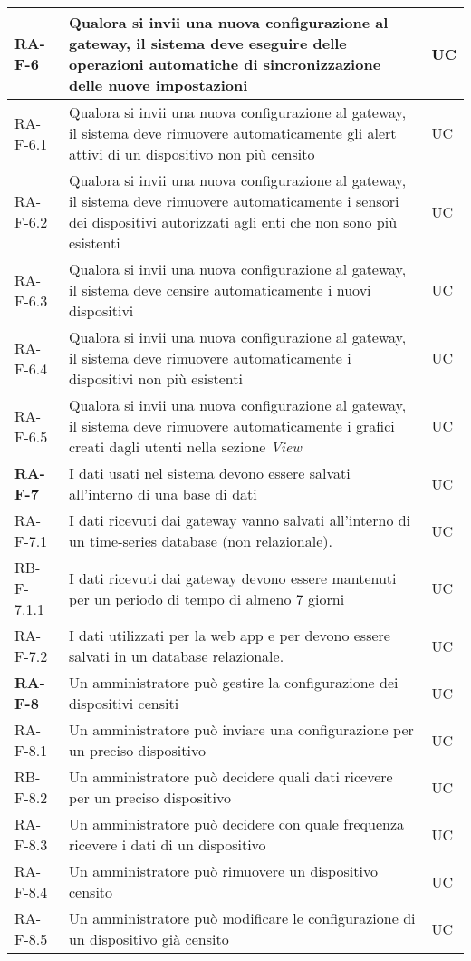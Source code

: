 \begin{center}
\begin{longtable}{|p{3cm}|p{9.85cm}|p{2cm}|}
		\textbf{RA-F-6} & Qualora si invii una nuova configurazione al gateway, il sistema deve eseguire delle operazioni automatiche di sincronizzazione delle nuove impostazioni & UC \\ \hline
		{\color{gray} RA-F-}6.1 & Qualora si invii una nuova configurazione al gateway, il sistema deve rimuovere automaticamente gli alert attivi di un dispositivo non più censito  & UC \\ \hline
		{\color{gray} RA-F-}6.2 & Qualora si invii una nuova configurazione al gateway, il sistema deve rimuovere automaticamente i sensori dei dispositivi autorizzati agli enti che non sono più esistenti & UC \\ \hline
		{\color{gray} RA-F-}6.3 & Qualora si invii una nuova configurazione al gateway, il sistema deve censire automaticamente i nuovi dispositivi & UC \\ \hline
		{\color{gray} RA-F-}6.4 & Qualora si invii una nuova configurazione al gateway, il sistema deve rimuovere automaticamente i dispositivi non più esistenti & UC \\ \hline
		{\color{gray} RA-F-}6.5 & Qualora si invii una nuova configurazione al gateway, il sistema deve rimuovere automaticamente i grafici creati dagli utenti nella sezione \textit{View} & UC \\ \hline

		\textbf{RA-F-7} & I dati usati nel sistema devono essere salvati all'interno di una base di dati & UC \\ \hline
		{\color{gray} RA-F-}7.1 & I dati ricevuti dai gateway vanno salvati all'interno di un time-series database (non relazionale). & UC \\ \hline
		{\color{gray} RB-F-}7.1.1 & I dati ricevuti dai gateway devono essere mantenuti per un periodo di tempo di almeno 7 giorni & UC \\ \hline
		{\color{gray} RA-F-}7.2 & I dati utilizzati per la web app e per \glock{Telegram} devono essere salvati in un database relazionale. & UC \\ \hline

		\textbf{RA-F-8} & Un amministratore può gestire la configurazione dei dispositivi censiti & UC \\ \hline
		{\color{gray} RA-F-}8.1 & Un amministratore può inviare una configurazione per un preciso dispositivo & UC \\ \hline
		{\color{gray} RB-F-}8.2 & Un amministratore può decidere quali dati ricevere per un preciso dispositivo & UC \\ \hline
		{\color{gray} RA-F-}8.3 & Un amministratore può decidere con quale frequenza ricevere i dati di un dispositivo & UC \\ \hline
		{\color{gray} RA-F-}8.4 & Un amministratore può rimuovere un dispositivo censito & UC \\ \hline
		{\color{gray} RA-F-}8.5 & Un amministratore può modificare le configurazione di un dispositivo già censito & UC \\ \hline
		\hline


\end{longtable}
\end{center}
